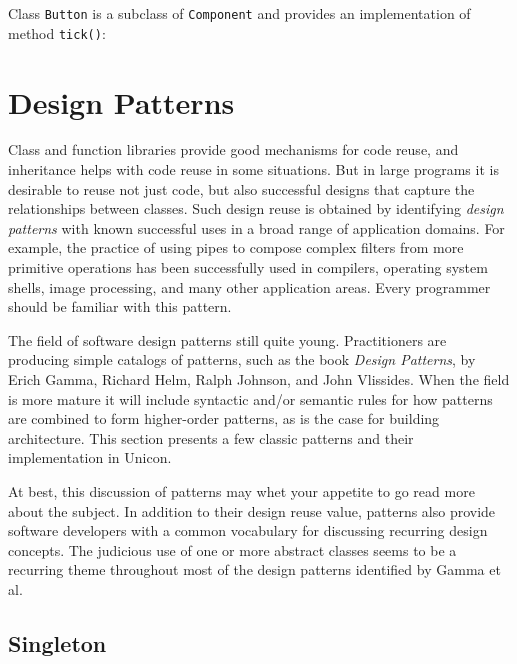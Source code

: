 
Class \texttt{Button} is a subclass of \texttt{Component} and
provides an implementation of method \texttt{tick()}:


\section{Design Patterns}

Class and function libraries provide good mechanisms for code reuse, and inheritance helps with code
reuse in some situations. But in large programs it is desirable to
reuse not just code, but also successful designs that capture the
relationships between classes. Such design reuse is obtained by
identifying \textit{design patterns} with known
successful uses in a broad range of application domains. For example,
the practice of using pipes to compose complex filters from more
primitive operations has been successfully used in compilers, operating
system shells, image processing, and many other application areas.
Every programmer should be familiar with this pattern.

The field of software design patterns still
quite young. Practitioners are producing simple catalogs of patterns,
such as the book \textit{Design Patterns}, by Erich Gamma, Richard
Helm, Ralph Johnson, and John Vlissides. When the field is more mature
it will include syntactic and/or semantic rules for how patterns are
combined to form higher-order patterns, as is the case for building
architecture. This section presents a few classic patterns and their
implementation in Unicon.

At best, this discussion of patterns may whet your appetite to go read
more about the subject. In addition to their design reuse value,
patterns also provide software developers with a common vocabulary for
discussing recurring design concepts. The judicious use of one or more
abstract classes seems to be a recurring theme throughout most of the
design patterns identified by Gamma et al.

\subsection*{Singleton}

